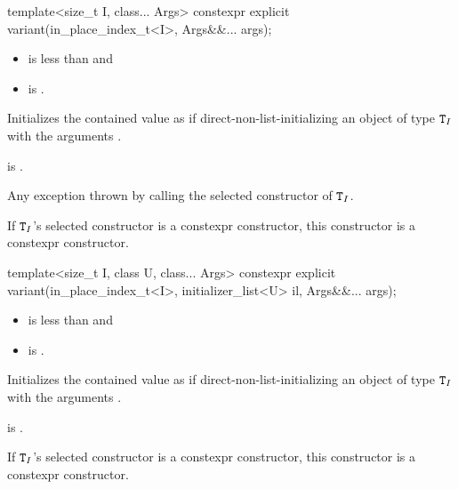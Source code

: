 %
\begin{itemdecl}
template<size_t I, class... Args> constexpr explicit variant(in_place_index_t<I>, Args&&... args);
\end{itemdecl}

\begin{itemdescr}
\pnum
\constraints
\begin{itemize}
\item
{} is less than  and
\item
{} is .
\end{itemize}

\pnum
\effects
Initializes the contained value as if direct-non-list-initializing
an object of type $\texttt{T}_I$
with the arguments .

\pnum
\ensures
{} is .

\pnum
\throws
Any exception thrown by calling the selected constructor of $\texttt{T}_I$.

\pnum
\remarks
If $\texttt{T}_I$'s selected constructor is a constexpr constructor, this
constructor is a constexpr constructor.
\end{itemdescr}

%
\begin{itemdecl}
template<size_t I, class U, class... Args>
  constexpr explicit variant(in_place_index_t<I>, initializer_list<U> il, Args&&... args);
\end{itemdecl}

\begin{itemdescr}
\pnum
\constraints
\begin{itemize}
\item
{} is less than  and
\item
{} is .
\end{itemize}

\pnum
\effects
Initializes the contained value as if direct-non-list-initializing
an object of type $\texttt{T}_I$
with the arguments .

\pnum
\ensures
{} is .

\pnum
\remarks
If $\texttt{T}_I$'s selected constructor is a constexpr constructor, this
constructor is a constexpr constructor.
\end{itemdescr}


